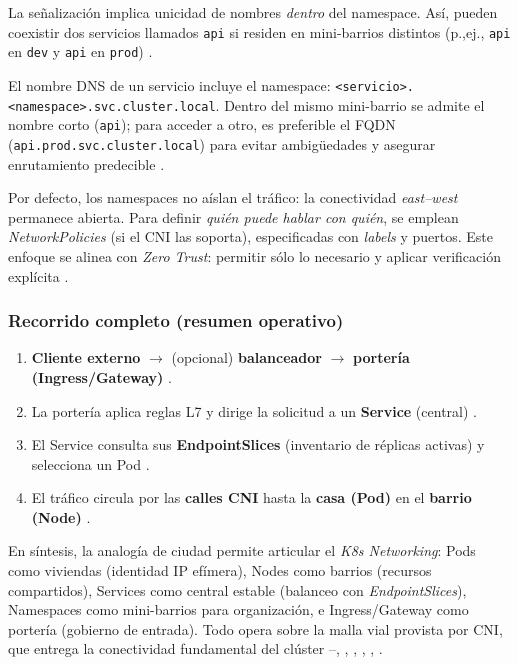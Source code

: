 \documentclass[journal]{IEEEtran}
\begin{document}
\medskip
La señalización implica unicidad de nombres \emph{dentro} del namespace. Así, pueden coexistir dos servicios llamados \texttt{api} si residen en mini-barrios distintos (p.,ej., \texttt{api} en \texttt{dev} y \texttt{api} en \texttt{prod}) \cite{ref2}.

\medskip
El nombre DNS de un servicio incluye el namespace: \texttt{<servicio>.<namespace>.svc.cluster.local}. Dentro del mismo mini-barrio se admite el nombre corto (\texttt{api}); para acceder a otro, es preferible el FQDN (\texttt{api.prod.svc.cluster.local}) para evitar ambigüedades y asegurar enrutamiento predecible \cite{ref13,ref2}.

\medskip
Por defecto, los namespaces no aíslan el tráfico: la conectividad \emph{east--west} permanece abierta. Para definir \emph{quién puede hablar con quién}, se emplean \emph{NetworkPolicies} (si el CNI las soporta), especificadas con \emph{labels} y puertos. Este enfoque se alinea con \emph{Zero Trust}: permitir sólo lo necesario y aplicar verificación explícita \cite{ref4,ref24,ref25,ref26}.

\medskip
\subsubsection{Recorrido completo (resumen operativo)}

\begin{enumerate}
\item \textbf{Cliente externo} $\rightarrow$ (opcional) \textbf{balanceador} $\rightarrow$ \textbf{portería (Ingress/Gateway)} \cite{ref17}.
\item La portería aplica reglas L7 y dirige la solicitud a un \textbf{Service} (central) \cite{ref3,ref13}.
\item El Service consulta sus \textbf{EndpointSlices} (inventario de réplicas activas) y selecciona un Pod \cite{ref1}.
\item El tráfico circula por las \textbf{calles CNI} hasta la \textbf{casa (Pod)} en el \textbf{barrio (Node)} \cite{ref2,ref4,ref18}.
\end{enumerate}

En síntesis, la analogía de ciudad permite articular el \emph{K8s Networking}: Pods como viviendas (identidad IP efímera), Nodes como barrios (recursos compartidos), Services como central estable (balanceo con \emph{EndpointSlices}), Namespaces como mini-barrios para organización, e Ingress/Gateway como portería (gobierno de entrada). Todo opera sobre la malla vial provista por CNI, que entrega la conectividad fundamental del clúster \cite{ref1}–\cite{ref4}, \cite{ref13}, \cite{ref17}, \cite{ref18}, \cite{ref20}, \cite{ref21}.
\end{document}
